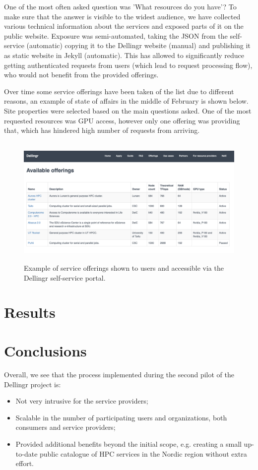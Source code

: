 \documentclass{article}
\newcommand{\dell}{Dellingr\xspace}
\begin{document}
One of the most often asked question was 'What resources do you have'? To make sure that the answer is visible to the widest audience, we have collected various technical information about the services and exposed parts of it on the public website. Exposure was semi-automated, taking the JSON from the self-service (automatic) copying it to the \dell website (manual) and publishing it as static website in Jekyll (automatic). This has allowed to significantly reduce getting authenticated requests from users (which lead to request processing flow), who would not benefit from the provided offerings.  

Over time some service offerings have been taken of the list due to different reasons, an example of state of affairs in the middle of February is shown below. Site properties were selected based on the main questions asked. 
One of the most requested resources was GPU access, however only one offering was providing that, which has hindered high number of requests from arriving.

\begin{figure}
\centering
\includegraphics[height=180pt]{Dellingr-list-of-resource.png}
\caption{Example of service offerings shown to users and accessible via the \dell self-service portal.}
\end{figure}

\section{Results}
\label{sec:results}


\section{Conclusions}

Overall, we see that the process implemented during the second pilot of the \dell project is:
\begin{itemize}
\item Not very intrusive for the service providers;
\item Scalable in the number of participating users and organizations, both consumers and service providers;
\item Provided additional benefits beyond the initial scope, e.g. creating a small up-to-date public catalogue of HPC services in the Nordic region without extra effort.
\end{itemize} 
\end{document}
